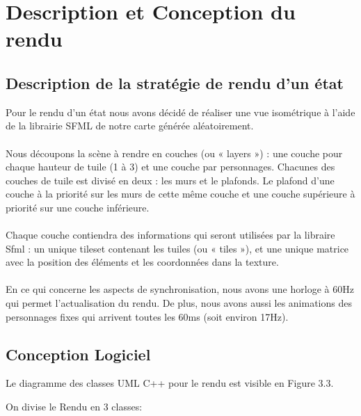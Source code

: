 \chapter{Description et Conception du rendu}


\section{Description de la stratégie de rendu d’un état}

Pour le rendu d'un état nous avons décidé de réaliser une vue isométrique 
à l'aide de la librairie SFML de notre carte générée
aléatoirement.  
\\
\\Nous découpons la scène à rendre en couches (ou « layers ») : une couche 
pour chaque hauteur de tuile (1 à 3) et une couche par personnages.
Chacunes des couches de tuile est divisé en deux : les murs et le
plafonds. Le plafond d'une couche à la priorité sur les murs de
cette même couche et une couche supérieure à priorité sur une
couche inférieure.
\\
\\Chaque couche contiendra des informations qui seront utilisées
par la libraire Sfml : un unique tileset contenant les tuiles 
(ou « tiles »), et une unique matrice avec 
la position des éléments et les coordonnées dans la texture.
\\
\\En ce qui concerne les aspects de synchronisation, nous avons 
une horloge à 60Hz qui permet l'actualisation du rendu. 
De plus, nous avons aussi les animations des personnages 
fixes qui arrivent toutes les 60ms (soit environ 17Hz).

\section{Conception Logiciel}

Le diagramme des classes UML C++ pour le rendu est visible en Figure 3.3.

On divise le Rendu en 3 classes:

